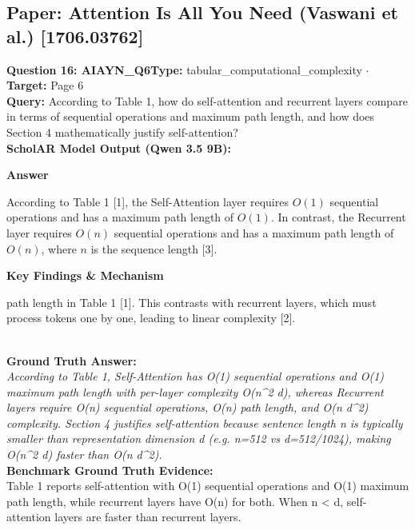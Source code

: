 \documentclass[10pt,a4paper]{article}
\begin{document}
\subsection{Paper: Attention Is All You Need (Vaswani et al.) [1706.03762]}
\vspace{-4pt}
\begin{tcolorbox}[questionbox]
{\noindent\bfseries\large\color{navy} Question 16: AIAYN\_Q6}\hfill {\footnotesize\color{darkteal}\textbf{Type:} tabular\_computational\_complexity $\cdot$ \textbf{Target:} Page 6}\\[4pt]
{\noindent\bfseries\color{accentblue} Query: } According to Table 1, how do self-attention and recurrent layers compare in terms of sequential operations and maximum path length, and how does Section 4 mathematically justify self-attention?\\[6pt]
{\noindent\bfseries\color{navy} ScholAR Model Output (Qwen 3.5 9B):}\\[2pt]
{\small \noindent \textbf{Answer}\par\vspace{3pt}According to Table 1 [1], the Self-Attention layer requires $O(1)$ sequential operations and has a maximum path length of $O(1)$. In contrast, the Recurrent layer requires $O(n)$ sequential operations and has a maximum path length of $O(n)$, where $n$ is the sequence length [3].\par\vspace{3pt}\noindent \textbf{Key Findings \& Mechanism}\par\vspace{3pt}path length in Table 1 [1]. This contrasts with recurrent layers, which must process tokens one by one, leading to linear complexity [2].}\\[6pt]
{\noindent\bfseries\color{darkteal} Ground Truth Answer:}\\[2pt]
{\small\itshape According to Table 1, Self-Attention has O(1) sequential operations and O(1) maximum path length with per-layer complexity O(n\textasciicircum{}2 d), whereas Recurrent layers require O(n) sequential operations, O(n) path length, and O(n d\textasciicircum{}2) complexity. Section 4 justifies self-attention because sentence length n is typically smaller than representation dimension d (e.g. n=512 vs d=512/1024), making O(n\textasciicircum{}2 d) faster than O(n d\textasciicircum{}2).}\\[4pt]
{\noindent\bfseries\color{darkteal} Benchmark Ground Truth Evidence:}\\[2pt]
{\footnotesize Table 1 reports self-attention with O(1) sequential operations and O(1) maximum path length, while recurrent layers have O(n) for both. When n < d, self-attention layers are faster than recurrent layers.}\\[4pt]

\end{tcolorbox}
\end{document}
